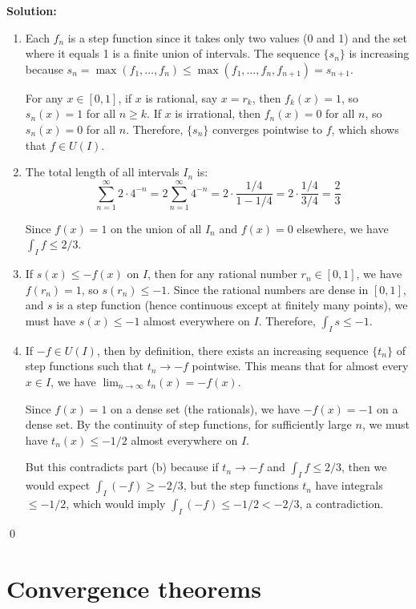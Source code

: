\noindent\textbf{Solution:}
\begin{enumerate}[label=(\alph*)]
    \item Each $f_n$ is a step function since it takes only two values (0 and 1) and the set where it equals 1 is a finite union of intervals. The sequence $\{s_n\}$ is increasing because $s_n = \max(f_1, \ldots, f_n) \leq \max(f_1, \ldots, f_n, f_{n+1}) = s_{n+1}$.

    For any $x \in [0, 1]$, if $x$ is rational, say $x = r_k$, then $f_k(x) = 1$, so $s_n(x) = 1$ for all $n \geq k$. If $x$ is irrational, then $f_n(x) = 0$ for all $n$, so $s_n(x) = 0$ for all $n$. Therefore, $\{s_n\}$ converges pointwise to $f$, which shows that $f \in U(I)$.

    \item The total length of all intervals $I_n$ is:
    \[\sum_{n=1}^{\infty} 2 \cdot 4^{-n} = 2 \sum_{n=1}^{\infty} 4^{-n} = 2 \cdot \frac{1/4}{1 - 1/4} = 2 \cdot \frac{1/4}{3/4} = \frac{2}{3}\]
    
    Since $f(x) = 1$ on the union of all $I_n$ and $f(x) = 0$ elsewhere, we have $\int_I f \leq 2/3$.

    \item If $s(x) \leq -f(x)$ on $I$, then for any rational number $r_n \in [0, 1]$, we have $f(r_n) = 1$, so $s(r_n) \leq -1$. Since the rational numbers are dense in $[0, 1]$, and $s$ is a step function (hence continuous except at finitely many points), we must have $s(x) \leq -1$ almost everywhere on $I$. Therefore, $\int_I s \leq -1$.

    \item If $-f \in U(I)$, then by definition, there exists an increasing sequence $\{t_n\}$ of step functions such that $t_n \to -f$ pointwise. This means that for almost every $x \in I$, we have $\lim_{n \to \infty} t_n(x) = -f(x)$.

    Since $f(x) = 1$ on a dense set (the rationals), we have $-f(x) = -1$ on a dense set. By the continuity of step functions, for sufficiently large $n$, we must have $t_n(x) \leq -1/2$ almost everywhere on $I$.

    But this contradicts part (b) because if $t_n \to -f$ and $\int_I f \leq 2/3$, then we would expect $\int_I (-f) \geq -2/3$, but the step functions $t_n$ have integrals $\leq -1/2$, which would imply $\int_I (-f) \leq -1/2 < -2/3$, a contradiction.
\end{enumerate}\qed
\section{Convergence theorems}


